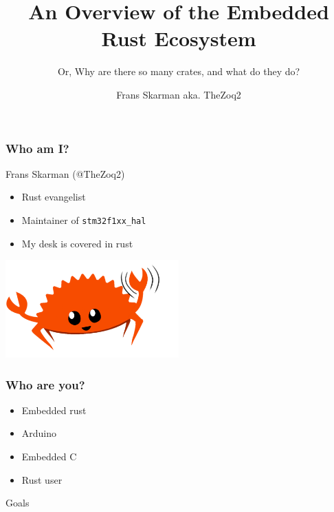 \documentclass[aspectratio=169]{beamer}
\title{An Overview of the Embedded Rust Ecosystem}
\subtitle{Or, Why are there so many crates, and what do they do?}
\author{Frans Skarman aka. TheZoq2}
\begin{document}
\maketitle


\begin{frame}
    \frametitle{Who am I?}
    
    Frans Skarman (@TheZoq2)

    \begin{itemize}
        \item Rust evangelist
        \item Maintainer of \texttt{stm32f1xx\_hal}
        \item My desk is covered in rust
    \end{itemize}

    \includegraphics[width=0.5\textwidth]{fig/wave.png}
\end{frame}

\begin{frame}
    \frametitle{Who are you?}

    \begin{itemize}[<+>]
        \item Embedded rust
        \item Arduino
        \item Embedded C
        \item Rust user
    \end{itemize}
\end{frame}

\begin{frame}{Goals}



\end{frame}
\end{document}
